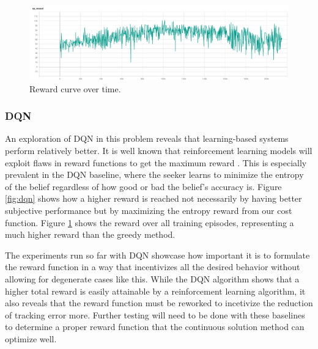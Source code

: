 \documentclass[10pt,twocolumn,letterpaper]{article}
\begin{document}
\begin{figure}[h!]
  \centering
  \includegraphics[width=\linewidth]{images/avg_dqn.png}
  \caption{Reward curve over time.}
  \label{fig:avg_dqn}
\end{figure}
\subsubsection{DQN}
An exploration of DQN in this problem reveals that learning-based systems perform relatively better.
It is well known that reinforcement learning models will exploit flaws in reward functions to get the maximum reward \cite{rlblogpost}.
This is especially prevalent in the DQN baseline, where the seeker learns to minimize the entropy of the belief regardless of how good or bad the belief's accuracy is.
Figure \ref{fig:dqn} shows how a higher reward is reached not necessarily by having better subjective performance but by maximizing the entropy reward from our cost function.
Figure \ref{fig:avg_dqn} shows the reward over all training episodes, representing a much higher reward than the greedy method.

The experiments run so far with DQN showcase how important it is to formulate the reward function in a way that incentivizes all the desired behavior without allowing for degenerate cases like this.
While the DQN algorithm shows that a higher total reward is easily attainable by a reinforcement learning algorithm, it also reveals that the reward function must be reworked to incetivize the reduction of tracking error more.
Further testing will need to be done with these baselines to determine a proper reward function that the continuous solution method can optimize well.
\end{document}
